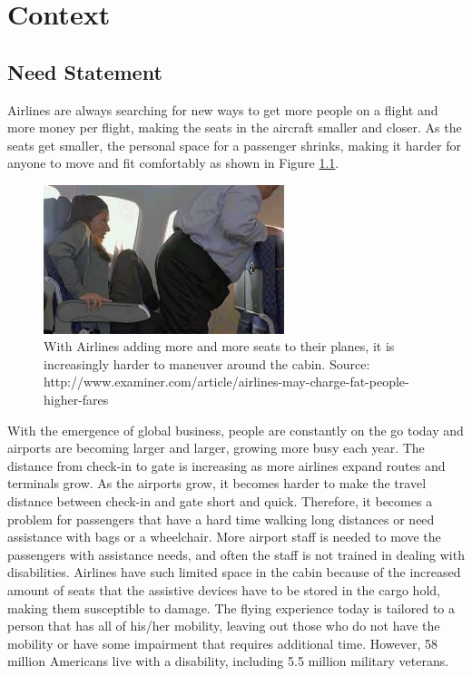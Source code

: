 \chapter{Context}
\label{sec-context} %

\section{Need Statement}
Airlines are always searching for new ways to get more people on a flight and more money per flight, making the seats in the aircraft smaller and closer. As the seats get smaller, the personal space for a passenger shrinks, making it harder for anyone to move and fit comfortably as shown in Figure \ref{fig:9}.

\begin{figure}[h]
  \centering
     \includegraphics[width=7cm]{images/image009.png}
   \caption{With Airlines adding more and more seats to their planes, it is increasingly harder to maneuver around the cabin. 
                  Source: http://www.examiner.com/article/airlines-may-charge-fat-people-higher-fares}
  \label{fig:9}
\end{figure}


With the emergence of global business, people are constantly on the go today and airports are becoming larger and larger, growing more busy each year.  The distance from check-in to gate is increasing as more airlines expand routes and terminals grow.  As the airports grow, it becomes harder to make the travel distance between check-in and gate short and quick.  Therefore, it becomes a problem for passengers that have a hard time walking long distances or need assistance with bags or a wheelchair. More airport staff is needed to move the passengers with assistance needs, and often the staff is not trained in dealing with disabilities.  Airlines have such limited space in the cabin because of the increased amount of seats that the assistive devices have to be stored in the cargo hold, making them susceptible to damage.  The flying experience today is tailored to a person that has all of his/her mobility, leaving out those who do not have the mobility or have some impairment that requires additional time. However, 58 million Americans live with a disability, including 5.5 million military veterans. \cite{}


